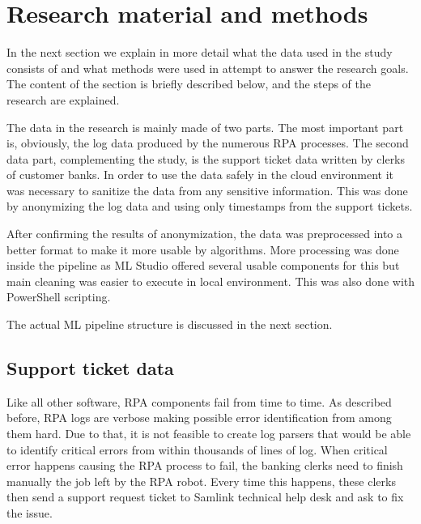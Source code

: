 

\section{Research material and methods}\label{sec:research-material-and-methods}

In the next section
we explain in more detail
what the data used in the study
consists of
and what methods were used
in attempt to answer the research goals.
The content of the section is briefly described below,
and the steps of the research are explained.

The data in the research is mainly made of two parts.
The most important part is, obviously,
the log data produced by the numerous RPA processes.
The second data part,
complementing the study,
is the support ticket data written by clerks of customer banks.
In order to use the data safely in the cloud environment
it was necessary to sanitize the data
from any sensitive information.
This was done by anonymizing the log data
and using only timestamps from the support tickets.

After confirming the results of anonymization,
the data was preprocessed into a better format
to make it more usable by algorithms.
More processing was done inside the pipeline
as ML Studio offered several usable components for this
but main cleaning was easier to execute in local environment.
This was also done with PowerShell scripting.

The actual ML pipeline structure
is discussed in the next section.


\subsection{Support ticket data}\label{subsec:meth-efecte-ticket-data}

Like all other software,
RPA components fail from time to time.
As described before,
RPA logs are verbose
making possible error identification from among them hard.
Due to that,
it is not feasible to create log parsers
that would be able to identify critical errors
from within thousands of lines of log.
When critical error happens
causing the RPA process to fail,
the banking clerks need to finish manually
the job left by the RPA robot.
Every time this happens,
these clerks then send a support request ticket
to Samlink technical help desk
and ask to fix the issue.

